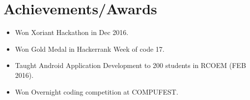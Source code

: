 \documentclass[letterpaper]{twentysecondcv} %
\begin{document}

\section{Achievements/Awards}

\begin{itemize}
  \item Won Xoriant Hackathon in Dec 2016.
  \item Won Gold Medal in Hackerrank Week of code 17.
  \item Taught Android Application Development to 200 students in RCOEM (FEB 2016).
  \item Won Overnight coding competition at COMPUFEST.
  
  
\end{itemize}
\end{document}

